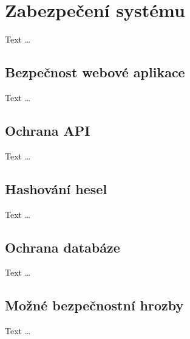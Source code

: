 
\section{Zabezpečení systému}
Text \dots


\subsection{Bezpečnost webové aplikace}
Text \dots


\subsection{Ochrana API}
Text \dots


\subsection{Hashování hesel}
Text \dots


\subsection{Ochrana databáze}
Text \dots

\subsection{Možné bezpečnostní hrozby}
Text \dots



